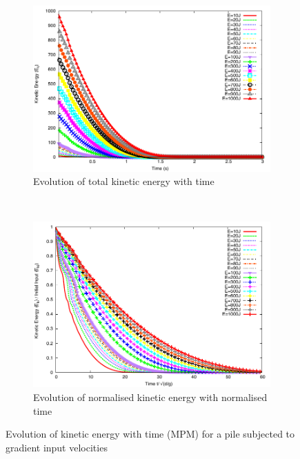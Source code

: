 \begin{figure}[tbhp]
\centering
\begin{subfigure}[b]{0.975\textwidth}
\includegraphics[width=\textwidth]{Energy_Slope}
\caption{Evolution of total kinetic energy with time}
\label{fig:energy_slope}
\end{subfigure}
\\
\begin{subfigure}[b]{0.975\textwidth}
\centering
\includegraphics[width=\textwidth]{Normalised_Energy_Time_Slope}
\caption{Evolution of normalised kinetic energy with normalised time}
\label{fig:Normalised_Energy_Time_Slope}
\end{subfigure}
\caption{Evolution of kinetic energy with time (MPM) for a pile subjected to 
gradient input velocities}
\label{fig:Energy_Time_Slope}
\end{figure}

